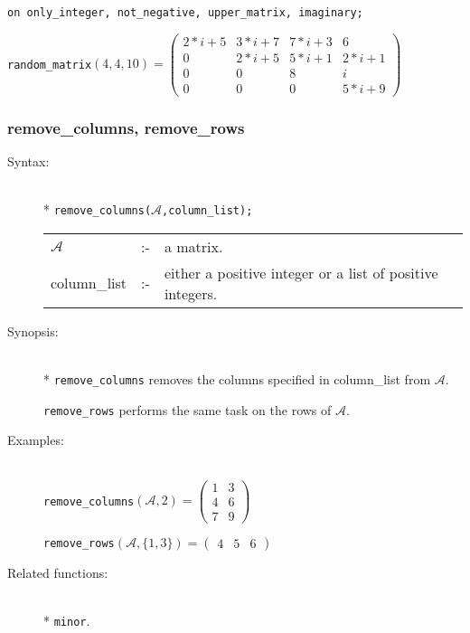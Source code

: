\begin{description}
  \texttt{on only\_integer, not\_negative, upper\_matrix, imaginary;}

  \texttt{random\_matrix}\((4,4,10) =
  \begin{pmatrix} 2*i+5 & 3*i+7 & 7*i+3 & 6 \\ 0 & 2*i+5 &
    5*i+1 & 2*i+1 \\ 0 & 0 & 8 & i \\ 0 & 0 & 0& 5*i+9
  \end{pmatrix}\)
\end{description}


\subsubsection{remove\_columns, remove\_rows}
\label{linalg:remove_columns}
\hypertarget{operator:REMOVE_COLUMNS}{}

\begin{description}
\item[Syntax:]\mbox{}\\*
\texttt{remove\_columns($\mathcal{A}$,column\_list);}\\[2mm]
\begin{tabular}{l l l}
$\mathcal{A}$   &:-& a matrix. \\
column\_list &:-& either a positive integer or a list of
                  positive integers.
\end{tabular}

\item[Synopsis:]\mbox{}\\*
\texttt{remove\_columns} removes the columns specified in
                column\_list from $\mathcal{A}$.

\texttt{remove\_rows} performs the same task on the rows
                of $\mathcal{A}$.

\item[Examples:]\mbox{}\\
\texttt{remove\_columns}\((\mathcal{A},2) =
        \begin{pmatrix} 1 & 3 \\ 4 & 6 \\ 7 & 9  \end{pmatrix}\)

\texttt{remove\_rows}\((\mathcal{A},\{1,3\}) =
        \begin{pmatrix} 4 & 5 & 6 \end{pmatrix}\)

\item[Related functions:]\mbox{}\\*
\texttt{minor}.
\end{description}


